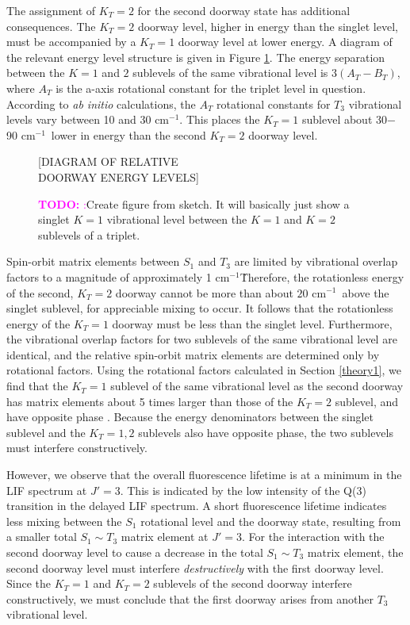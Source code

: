 \documentclass[12pt]{mitthesis}
\newcommand{\TODO} [1]{\textcolor{magenta}{\textbf{TODO:} #1}}
\newcommand{\rcm}{cm$^{-1}$}
\begin{document}
The assignment of $K_T=2$ for the second doorway state has additional
consequences.  The $K_T=2$ doorway level, higher in energy than the
singlet level, must be accompanied by a $K_T=1$ doorway level at lower
energy.  A diagram of the relevant energy level structure is given in
Figure \ref{fig:double-doorway-k-levels}. The energy separation
between the $K=1$ and $2$ sublevels of the same vibrational level is
$3(A_T-B_T)$, where $A_T$ is the a-axis rotational constant for the
triplet level in question.  According to \emph{ab initio}
calculations, the $A_T$ rotational constants for $T_3$ vibrational
levels vary between 10 and 30 \rcm \cite{thom07}.  This places the
$K_T=1$ sublevel about 30$-$90 \rcm\ lower in energy than the second
$K_T=2$ doorway level.

\begin{figure}
  \caption{\TODO:{Create figure from sketch.  It will basically just
      show a singlet $K=1$ vibrational level between the $K=1$ and
      $K=2$ sublevels of a triplet.}}
  \label{fig:double-doorway-k-levels}


  \vspace{4in}
  [DIAGRAM OF RELATIVE\\ 
   DOORWAY ENERGY LEVELS]
  \vspace{4in}

\end{figure}

Spin-orbit matrix elements between $S_1$ and $T_3$ are limited by
vibrational overlap factors to a magnitude of approximately 1 \rcm\.
Therefore, the rotationless energy of the second, $K_T=2$ doorway
cannot be more than about $20$ \rcm\ above the singlet sublevel, for
appreciable mixing to occur.  It follows that the rotationless energy
of the $K_T=1$ doorway must be less than the singlet level.
Furthermore, the vibrational overlap factors for two sublevels of the
same vibrational level are identical, and the relative spin-orbit
matrix elements are determined only by rotational factors.  Using the
rotational factors calculated in Section \ref{theory1}, we find that
the $K_T=1$ sublevel of the same vibrational level as the second
doorway has matrix elements about 5 times larger than those of the
$K_T=2$ sublevel, and have opposite phase \cite{stevens73}.  Because
the energy denominators between the singlet sublevel and the $K_T=1,2$
sublevels also have opposite phase, the two sublevels must interfere
constructively.

However, we observe that the overall fluorescence lifetime is at a
minimum in the LIF spectrum at $J'=3$.  This is indicated by the low
intensity of the Q(3) transition in the delayed LIF spectrum.  A short
fluorescence lifetime indicates less mixing between the $S_1$
rotational level and the doorway state, resulting from a smaller total
$S_1 \sim T_3$ matrix element at $J'=3$.  For the interaction with the
second doorway level to cause a decrease in the total $S_1 \sim T_3$
matrix element, the second doorway level must interfere
\emph{destructively} with the first doorway level.  Since the $K_T=1$
and $K_T=2$ sublevels of the second doorway interfere constructively,
we must conclude that the first doorway arises from another $T_3$
vibrational level.
\end{document}
